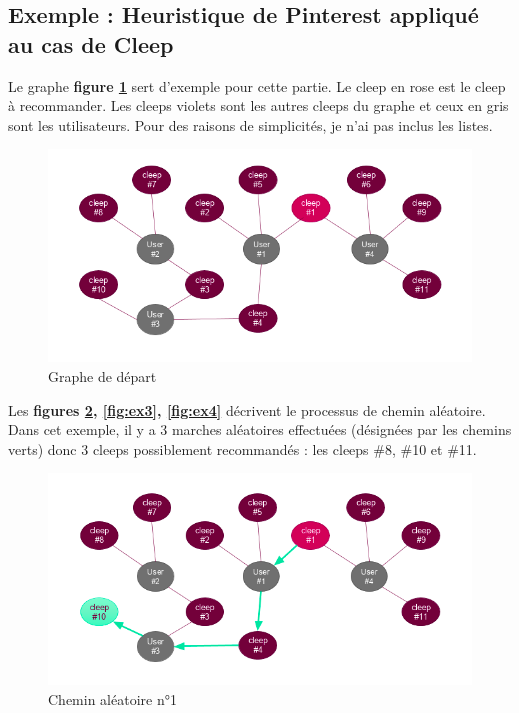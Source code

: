 \documentclass{article} %
\begin{document}
{\subsection{Exemple : Heuristique de Pinterest appliqué au cas de Cleep}

Le graphe \textbf{figure \ref{fig:ex1}} sert d'exemple pour cette partie. Le cleep en rose est le cleep à recommander. Les cleeps violets sont les autres cleeps du graphe et ceux en gris sont les utilisateurs. Pour des raisons de simplicités, je n'ai pas inclus les listes.
\begin{figure}[!h]
 \centering
 \includegraphics[keepaspectratio = true,scale=0.6]{ex1}
 \caption{Graphe de départ}
 \label{fig:ex1}
\end{figure}

Les \textbf{figures \ref{fig:ex2}, \ref{fig:ex3}, \ref{fig:ex4}} décrivent le processus de chemin aléatoire. Dans cet exemple, il y a 3 marches aléatoires effectuées (désignées par les chemins verts) donc 3 cleeps possiblement recommandés : les cleeps \#8, \#10 et \#11.
\begin{figure}[!h]
 \centering
 \includegraphics[keepaspectratio = true,scale=0.6]{ex2}
 \caption{Chemin aléatoire n°1}
 \label{fig:ex2}
\end{figure}

}
\end{document}
